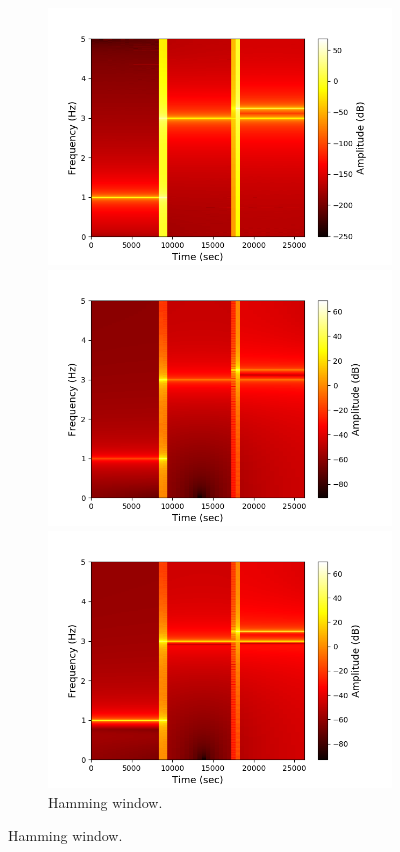 \begin{figure}[H]
\centering
\begin{subfigure}{0.49\textwidth}
\centering
\includegraphics[width=\textwidth]{figures/stft_windows/hanning_10000.png}
\caption{Hanning window.}
\label{fig:stft_hanning}
\includegraphics[width=\textwidth]{figures/stft_windows/hamming_10000.png}
\caption{Hamming window.}
\label{fig:stft_hamming}
\includegraphics[width=\textwidth]{figures/stft_windows/kaiser/10000/4.png}

\end{subfigure}
\end{figure}
